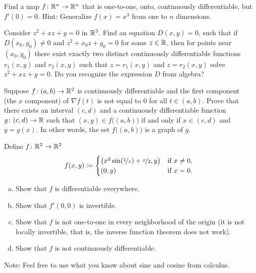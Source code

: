 \begin{exercise}
Find a map $f \colon {\mathbb{R}}^n \to {\mathbb{R}}^n$ that is one-to-one, onto,
continuously differentiable, but $f'(0) = 0$.  Hint: Generalize $f(x) = x^3$ from one
to $n$ dimensions.
\end{exercise}

\begin{exercise}
Consider $z^2 + xz + y =0$ in ${\mathbb{R}}^3$.  Find an equation $D(x,y)=0$, such that
if $D(x_0,y_0) \not= 0$ and $z^2+x_0z+y_0 = 0$ for some $z \in {\mathbb{R}}$,
then for points near $(x_0,y_0)$ there exist
exactly two distinct continuously differentiable functions $r_1(x,y)$
and $r_2(x,y)$ such that $z=r_1(x,y)$ and $z=r_2(x,y)$ solve
$z^2 + xz + y =0$.  Do you recognize the expression $D$ from algebra?
\end{exercise}


\begin{exercise}
Suppose $f \colon (a,b) \to {\mathbb{R}}^2$ is continuously differentiable and
the first component (the $x$ component) of $\nabla f(t)$ is not equal to 0
for all $t \in (a,b)$.
Prove that there exists an interval $(c,d)$ and
a continuously differentiable function $g \colon (c,d) \to {\mathbb{R}}$
such that 
$(x,y) \in f\bigl((a,b)\bigr)$ if and only if $x \in (c,d)$ and $y=g(x)$.
In other words, the set
$f\bigl((a,b)\bigr)$ is a graph of $g$.
\end{exercise}

\begin{samepage}
\begin{exercise}
Define $f \colon {\mathbb{R}}^2 \to {\mathbb{R}}^2$
\begin{equation*}
f(x,y) \coloneqq
\begin{cases}
\bigl(x^2 \sin (\nicefrac{1}{x}) + \nicefrac{x}{2} , y \bigr) &
 \text{if } x \not= 0, \\
(0,y) &
 \text{if } x=0.
\end{cases}
\end{equation*}
\begin{enumerate}[a)]
\item
Show that $f$ is differentiable everywhere.
\item
Show that $f'(0,0)$ is invertible.
\item
Show that $f$ is not one-to-one in every neighborhood of the origin (it is
not locally invertible, that is, the inverse function theorem does not work).
\item
Show that $f$ is not continuously differentiable.
\end{enumerate}
Note: Feel free to use what you know about sine and cosine from calculus.
\end{exercise}
\end{samepage}

